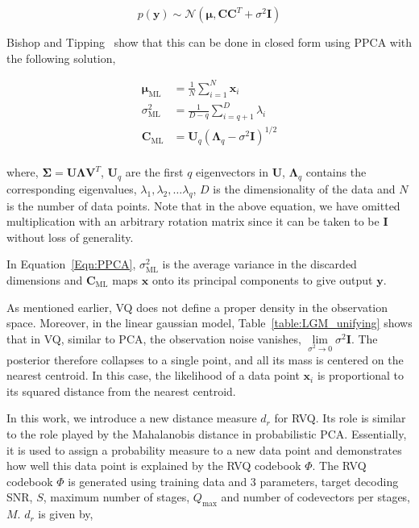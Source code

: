 \begin{equation}
p(\mathbf{y}) \sim \mathcal{N}(\boldsymbol\mu, \mathbf{C}\mathbf{C}^T + \sigma^2 \mathbf{I})
\end{equation}

Bishop and Tipping~\cite{1999_JNL_PPCA_Tipping} show that this can be done in closed form using PPCA with the following solution,

\begin{equation}
\begin{array}{lllll}
\mathbf{\boldsymbol\mu}_{\textrm{ML}} &=\frac{1}{N}\sum\limits_{i=1}^N \mathbf{x}_i\\
\sigma^2_{\textrm{ML}} &= \frac{1}{D-q}\sum\limits_{i=q+1}^D \lambda_i\\
\mathbf{C}_{\textrm{ML}} &= \mathbf{U}_q(\mathbf{\Lambda}_q - \sigma^2\mathbf{I})^{1/2} \\
\end{array}
\label{Eqn:PPCA}
\end{equation}

where, $\boldsymbol\Sigma = \mathbf{U}\mathbf{\Lambda}\mathbf{V}^T$, $\mathbf{U}_q$ are the first $q$ eigenvectors in $\mathbf{U}$, $\mathbf{\Lambda}_q$ contains the corresponding eigenvalues, $\lambda_1, \lambda_2, \ldots \lambda_q$, $D$ is the dimensionality of the data and $N$ is the number of data points.  Note that in the above equation, we have omitted multiplication with an arbitrary rotation matrix since it can be taken to be $\mathbf{I}$ without loss of generality.  

In Equation~\ref{Eqn:PPCA}, $\sigma^2_{\textrm{ML}}$ is the average variance in the discarded dimensions and $\mathbf{C}_{\textrm{ML}}$ maps $\mathbf{x}$ onto its principal components to give output $\mathbf{y}$.

As mentioned earlier, VQ does not define a proper density in the observation space.  Moreover, in the linear gaussian model, Table~\ref{table:LGM_unifying} shows that in VQ, similar to PCA, the observation noise vanishes, $\lim\limits_{\sigma^2 \rightarrow 0} \sigma^2\mathbf{I}$.  The posterior therefore collapses to a single point, and all its mass is centered on the nearest centroid.  In this case, the likelihood of a data point $\mathbf{x}_i$ is proportional to its squared distance from the nearest centroid.

In this work, we introduce a new distance measure $d_r$ for RVQ.  Its role is similar to the role played by the Mahalanobis distance in probabilistic PCA.  Essentially, it is used to assign a probability measure to a new data point and demonstrates how well this data point is explained by the RVQ codebook $\Phi$.  The RVQ codebook $\Phi$ is generated using training data and 3 parameters, target decoding SNR, $S$, maximum number of stages, $Q_{\textrm{max}}$ and number of codevectors per stages, $M$.  $d_r$ is given by,




